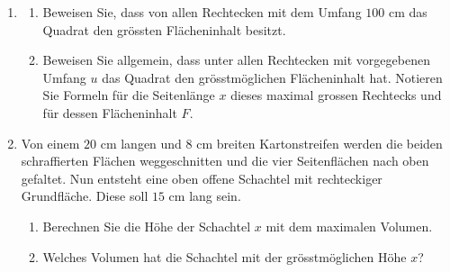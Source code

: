 \begin{enumerate}
\begin{minipage}[t]{0.3\textwidth}
          \end{minipage}
    \item \begin{enumerate}
              \item Beweisen Sie, dass von allen Rechtecken mit dem Umfang $100$ cm das Quadrat den grössten Flächeninhalt besitzt.
              \item Beweisen Sie allgemein, dass unter allen Rechtecken mit vorgegebenen Umfang $u$ das Quadrat den grösstmöglichen Flächeninhalt hat. Notieren Sie Formeln für die Seitenlänge $x$ dieses maximal grossen Rechtecks und für dessen Flächeninhalt $F$.
          \end{enumerate}
    \item \begin{minipage}[t]{0.6\textwidth}
              Von einem $20$ cm langen und $8$ cm breiten Kartonstreifen werden die beiden schraffierten Flächen weggeschnitten und die vier Seitenflächen nach oben gefaltet. Nun entsteht eine oben offene Schachtel mit rechteckiger Grundfläche. Diese soll $15$ cm lang sein.
              \begin{enumerate}
                  \item Berechnen Sie die Höhe der Schachtel $x$ mit dem maximalen Volumen.
                  \item Welches Volumen hat die Schachtel mit der grösstmöglichen Höhe $x$?
              \end{enumerate}
          \end{minipage}
          \begin{minipage}[t]{0.4\textwidth}
              \vspace{0pt}
              \begin{center}
\end{center}
\end{minipage}
\end{enumerate}
